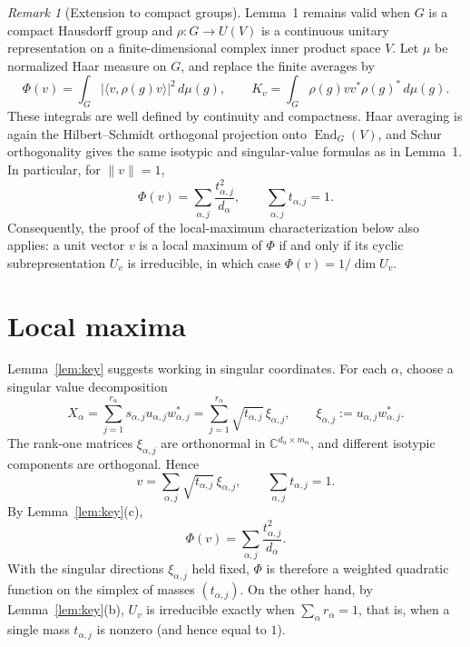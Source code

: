 \documentclass{amsart}
\theoremstyle{remark}
\newtheorem{remark}[theorem]{Remark}
\newcommand{\C}{\mathbb C}
\begin{document}
\begin{remark}[Extension to compact groups]
Lemma~1 remains valid when $G$ is a compact Hausdorff group
and $\rho:G\to U(V)$ is a continuous unitary representation
on a finite-dimensional complex inner product space $V$.
Let $\mu$ be normalized Haar measure on $G$, and replace
the finite averages by
\[
\Phi(v)
  = \int_G |\langle v,\rho(g)v\rangle|^2\,d\mu(g),
\qquad
K_v
  = \int_G \rho(g)vv^*\rho(g)^*\,d\mu(g).
\]
These integrals are well defined by continuity and compactness.
Haar averaging is again the Hilbert--Schmidt orthogonal
projection onto $\operatorname{End}_G(V)$, and Schur
orthogonality gives the same isotypic and singular-value
formulas as in Lemma~1. In particular, for $\|v\|=1$,
\[
\Phi(v)=\sum_{\alpha,j}\frac{t_{\alpha,j}^2}{d_\alpha},
\qquad
\sum_{\alpha,j}t_{\alpha,j}=1.
\]
Consequently, the proof of the local-maximum characterization
below also applies: a unit vector $v$ is a local maximum
of $\Phi$ if and only if its cyclic subrepresentation $U_v$
is irreducible, in which case $\Phi(v)=1/\dim U_v$.
\end{remark}
 
\section{Local maxima}\label{sec:max}
 
Lemma~\ref{lem:key} suggests working in singular coordinates. For each $\alpha$, choose a
singular value decomposition
\begin{equation}\label{eq:svd}
 X_\alpha
 =\sum_{j=1}^{r_\alpha}s_{\alpha,j}u_{\alpha,j}w_{\alpha,j}^*
 =\sum_{j=1}^{r_\alpha}\sqrt{t_{\alpha,j}}\,\xi_{\alpha,j},
 \qquad
 \xi_{\alpha,j}:=u_{\alpha,j}w_{\alpha,j}^*.
\end{equation}
The rank-one matrices $\xi_{\alpha,j}$ are orthonormal in $\C^{d_\alpha\times m_\alpha}$, and
different isotypic components are orthogonal. Hence
\begin{equation}\label{eq:v-singular}
 v=\sum_{\alpha,j}\sqrt{t_{\alpha,j}}\,\xi_{\alpha,j},
 \qquad
 \sum_{\alpha,j}t_{\alpha,j}=1.
\end{equation}
By Lemma~\ref{lem:key}(c),
\begin{equation}\label{eq:Phi-singular}
 \Phi(v)=\sum_{\alpha,j}\frac{t_{\alpha,j}^2}{d_\alpha}.
\end{equation}
With the singular directions $\xi_{\alpha,j}$ held fixed, $\Phi$ is therefore a weighted quadratic
function on the simplex of masses $(t_{\alpha,j})$. On the other hand, by Lemma~\ref{lem:key}(b),
$U_v$ is irreducible exactly when $\sum_\alpha r_\alpha=1$, that is, when a single mass
$t_{\alpha,j}$ is nonzero (and hence equal to $1$).
 
\end{document}
